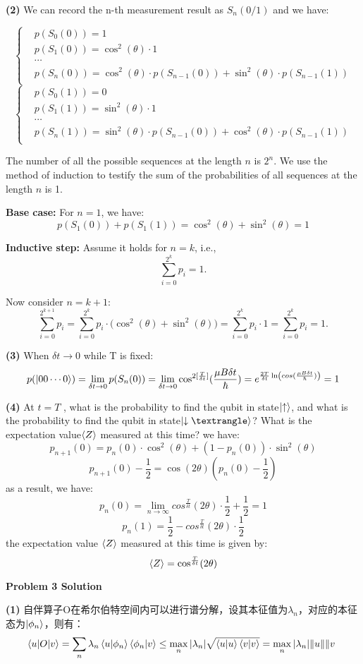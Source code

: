 \documentclass[12pt]{article}
\begin{document}
\textbf{(2)} 
We can record the n-th measurement result as $S_{n}(0/1)$ and we have:

\[
\left\{
\begin{aligned}
    &p(S_{0}(0)) = 1 \\
    &p(S_{1}(0)) = \cos^2(\theta) \cdot 1 \\
    &\cdots \\
    &p(S_{n}(0)) = \cos^2(\theta) \cdot p(S_{n-1}(0)) + \sin^2(\theta) \cdot p(S_{n-1}(1)) \\
\end{aligned}
\right.
\]
\[
\left\{
\begin{aligned}
    &p(S_{0}(1)) = 0 \\
    &p(S_{1}(1)) = \sin^2(\theta) \cdot 1 \\
    &\cdots \\
    &p(S_{n}(1)) = \sin^2(\theta) \cdot p(S_{n-1}(0))+ \cos^2(\theta) \cdot p(S_{n-1}(1)) \\
\end{aligned}
\right.
\]

The number of all the possible sequences at the length $n$ is $2^n$. We use the method of induction to testify the sum of the probabilities of all sequences at the length $n$ is 1.

\textbf{Base case:} For $n=1$, we have:
\[
p(S_{1}(0)) + p(S_{1}(1)) = \cos^2(\theta) + \sin^2(\theta) = 1
\]

\textbf{Inductive step:} Assume it holds for $n=k$, i.e.,
\[
\sum_{i=0}^{2^k} p_i = 1.
\]

Now consider $n = k+1$:
\[
\sum_{i=0}^{2^{k+1}} p_i
= \sum_{i=0}^{2^k} p_i \cdot \bigl(\cos^2(\theta) + \sin^2(\theta)\bigr)
= \sum_{i=0}^{2^k} p_i \cdot 1
= \sum_{i=0}^{2^k} p_i
= 1.
\]

\textbf{(3)} When $\delta t\to 0$ while T is fixed:
\[
p(\ket{00\cdots 0}) = \lim_{\delta t \to 0} p(S_{n}(0)) = \lim_{\delta t \to 0} \cos^{2[\frac{T}{\delta t}]}(\frac{\mu B \delta t}{\hbar}) = e^{\frac{2T}{\delta t}\ln(cos(\frac{\mu B \delta t}{\hbar}))}=1
\]

\textbf{(4)}  At $t = T$ , what is the probability to find the qubit in state$\ket{\uparrow}$, and what is the probability to find the qubit in state$\ket{ \downarrow⟩}$? What is the expectation value$ \braket{Z}$ measured at this time? 
we have:
\[
p_{n+1}(0)=p_{n}(0)\cdot\cos^2(\theta)+(1-p_{n}(0))\cdot \sin^2(\theta) 
\]
\[
p_{n+1}(0)-\frac{1}{2}=\cos(2\theta)(p_{n}(0)-\frac{1}{2})
\]
as a result, we have:
$$p_n(0)=\lim_{n\to \infty}cos^{\frac{T}{\delta t}}(2\theta)\cdot\frac{1}{2}+\frac{1}{2}=1$$
\[
p_n(1)=\frac{1}{2}-cos^{\frac{T}{\delta t}}(2\theta)\cdot\frac{1}{2}
\]
the expectation value $\braket{Z}$ measured at this time is given by:
\[
\braket{Z}=\cos^{\frac{T}{\delta t}}(2\theta)\]

\begin{center}
    \textbf{Problem 3 Solution}
\end{center}

\textbf{(1)} 
自伴算子O在希尔伯特空间内可以进行谱分解，设其本征值为$\lambda_n$，对应的本征态为$\ket{\phi_n}$，则有：
\[
\braket{u|O|v} = \sum_n \lambda_n \braket{u|\phi_n}\braket{\phi_n|v} \le \max_n |\lambda_n| \sqrt{\braket{u|u} \braket{v|v}} = \max_n |\lambda_n| \|u\| \|v\ 
 \]
\end{document}
